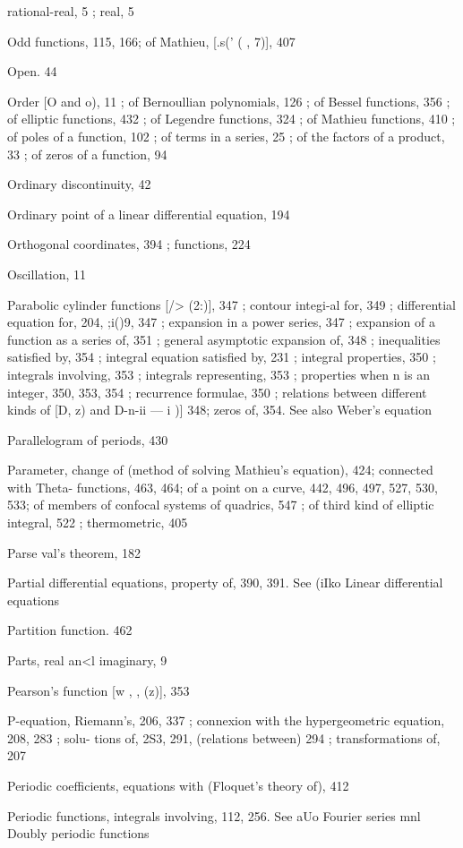 rational-real, 5 ; real, 5

Odd functions, 115, 166; of Mathieu, [.s(' ( , 7)], 407

Open. 44

Order [O and o), 11 ; of Bernoullian polynomials, 126 ; of Bessel functions, 356 ; of elliptic
functions, 432 ; of Legendre functions, 324 ; of Mathieu functions, 410 ; of poles of a
function, 102 ; of terms in a series, 25 ; of the factors of a product, 33 ; of zeros of a
function, 94

Ordinary discontinuity, 42

Ordinary point of a linear differential equation, 194

Orthogonal coordinates, 394 ; functions, 224

Oscillation, 11

Parabolic cylinder functions [/>  (2:)], 347 ; contour integi-al for, 349 ; differential equation for,
204, ;i()9, 347 ; expansion in a power series, 347 ; expansion of a function as a series of, 351 ;
general asymptotic expansion of, 348 ; inequalities satisfied by, 354 ; integral equation
satisfied by, 231 ; integral properties, 350 ; integrals involving, 353 ; integrals representing,
353 ; properties when n is an integer, 350, 353, 354 ; recurrence formulae, 350 ; relations
between different kinds of [D,  z) and D-n-ii — i )]  348; zeros of, 354. See also Weber's
equation

Parallelogram of periods, 430

Parameter, change of (method of solving Mathieu's equation), 424; connected with Theta-
functions, 463, 464; of a point on a curve, 442, 496, 497, 527, 530, 533; of members of
confocal systems of quadrics, 547 ; of third kind of elliptic integral, 522 ; thermometric, 405

Parse val's theorem, 182

Partial differential equations, property of, 390, 391. See (iIko Linear differential equations

Partition function. 462

Parts, real an<l imaginary, 9

Pearson's function [w ,  , (z)], 353

P-equation, Riemann's, 206, 337 ; connexion with the hypergeometric equation, 208, 283 ; solu-
tions of, 2S3, 291, (relations between) 294 ; transformations of, 207

Periodic coefficients, equations with (Floquet's theory of), 412

Periodic functions, integrals involving, 112, 256. See aUo Fourier series mnl Doubly periodic
functions

